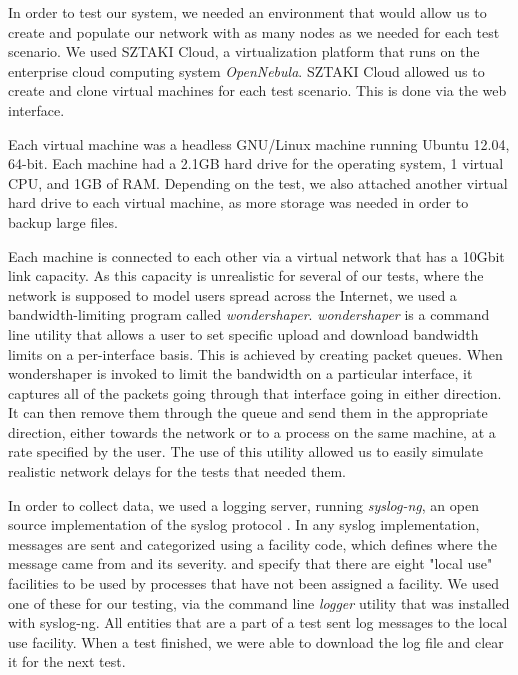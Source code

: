 \documentclass[12pt]{report}
\begin{document}
In order to test our system, we needed an environment that would allow us to create and populate our network with as many nodes as we needed for each test scenario. We used SZTAKI Cloud, a virtualization platform that runs on the enterprise cloud computing system \textit{OpenNebula}. SZTAKI Cloud allowed us to create and clone virtual machines for each test scenario. This is done via the web interface. %

Each virtual machine was a headless GNU/Linux machine running Ubuntu 12.04, 64-bit. Each machine had a 2.1GB hard drive for the operating system, 1 virtual CPU, and 1GB of RAM. Depending on the test, we also attached another virtual hard drive to each virtual machine, as more storage was needed in order to backup large files.

Each machine is connected to each other via a virtual network that has a 10Gbit link capacity. As this capacity is unrealistic for several of our tests, where the network is supposed to model users spread across the Internet, we used a bandwidth-limiting program called \textit{wondershaper}. \textit{wondershaper} is a command line utility that allows a user to set specific upload and download bandwidth limits on a per-interface basis. This is achieved by creating packet queues. When wondershaper is invoked to limit the bandwidth on a particular interface, it captures all of the packets going through that interface going in either direction. It can then remove them through the queue and send them in the appropriate direction, either towards the network or to a process on the same machine, at a rate specified by the user. The use of this utility allowed us to easily simulate realistic network delays for the tests that needed them.

In order to collect data, we used a logging server, running \textit{syslog-ng}, an open source implementation of the syslog protocol \cite{syslogRFC1,syslogRFC2}. In any syslog implementation, messages are sent and categorized using a facility code, which defines where the message came from and its severity. \cite{syslogRFC1} and \cite{syslogRFC2} specify that there are eight "local use" facilities to be used by processes that have not been assigned a facility. We used one of these for our testing, via the command line \textit{logger} utility that was installed with syslog-ng. All entities that are a part of a test sent log messages to the local use facility. When a test finished, we were able to download the log file and clear it for the next test.
\end{document}
